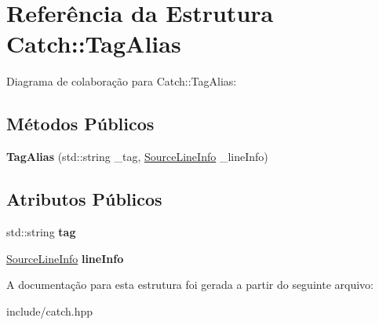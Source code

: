 \hypertarget{structCatch_1_1TagAlias}{}\section{Referência da Estrutura Catch\+:\+:Tag\+Alias}
\label{structCatch_1_1TagAlias}


Diagrama de colaboração para Catch\+:\+:Tag\+Alias\+:
\subsection*{Métodos Públicos}
\begin{DoxyCompactItemize}
\item 
{\bfseries Tag\+Alias} (std\+::string \+\_\+tag, \hyperlink{structCatch_1_1SourceLineInfo}{Source\+Line\+Info} \+\_\+line\+Info)\hypertarget{structCatch_1_1TagAlias_ad9124d03bfb6f767f1c97572330b05bc}{}\label{structCatch_1_1TagAlias_ad9124d03bfb6f767f1c97572330b05bc}

\end{DoxyCompactItemize}
\subsection*{Atributos Públicos}
\begin{DoxyCompactItemize}
\item 
std\+::string {\bfseries tag}\hypertarget{structCatch_1_1TagAlias_a950183883ab17c90d0fab16b966b6e2d}{}\label{structCatch_1_1TagAlias_a950183883ab17c90d0fab16b966b6e2d}

\item 
\hyperlink{structCatch_1_1SourceLineInfo}{Source\+Line\+Info} {\bfseries line\+Info}\hypertarget{structCatch_1_1TagAlias_a2f51fe0b3c052561275d26b6eb88f702}{}\label{structCatch_1_1TagAlias_a2f51fe0b3c052561275d26b6eb88f702}

\end{DoxyCompactItemize}


A documentação para esta estrutura foi gerada a partir do seguinte arquivo\+:\begin{DoxyCompactItemize}
\item 
include/catch.\+hpp\end{DoxyCompactItemize}
